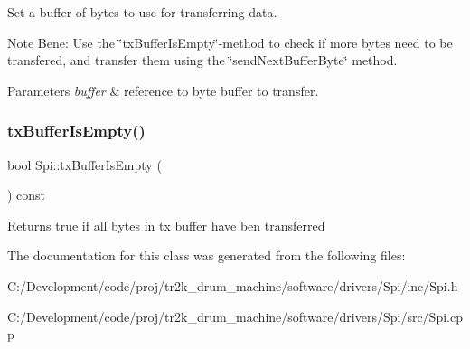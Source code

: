 Set a buffer of bytes to use for transferring data.

Note Bene\+: Use the \char`\"{}tx\+Buffer\+Is\+Empty\char`\"{}-\/method to check if more bytes need to be transfered, and transfer them using the \char`\"{}send\+Next\+Buffer\+Byte\char`\"{} method.


\begin{DoxyParams}{Parameters}
{\em buffer} & reference to byte buffer to transfer. \\
\hline
\end{DoxyParams}
\mbox{\label{class_spi_a8cf0289f4aaa9298b479a48de1dd6cb8}} 
\subsubsection{\texorpdfstring{txBufferIsEmpty()}{txBufferIsEmpty()}}
{\footnotesize\ttfamily bool Spi\+::tx\+Buffer\+Is\+Empty (\begin{DoxyParamCaption}{ }\end{DoxyParamCaption}) const}

\begin{DoxyReturn}{Returns}
true if all bytes in tx buffer have ben transferred 
\end{DoxyReturn}


The documentation for this class was generated from the following files\+:\begin{DoxyCompactItemize}
\item 
C\+:/\+Development/code/proj/tr2k\+\_\+drum\+\_\+machine/software/drivers/\+Spi/inc/Spi.\+h\item 
C\+:/\+Development/code/proj/tr2k\+\_\+drum\+\_\+machine/software/drivers/\+Spi/src/Spi.\+cpp\end{DoxyCompactItemize}
